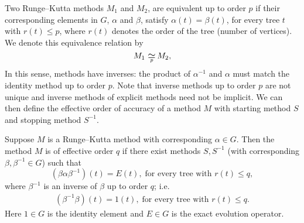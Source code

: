 Two Runge--Kutta methods $M_1$ and $M_2$, are equivalent up to order
$p$ if their corresponding elements in $G$, $\alpha$ and $\beta$, satisfy
$\alpha(t) = \beta(t)$, for every tree $t$ with $r(t) \leq p$,
where $r(t)$ denotes the order of the tree (number of vertices).
We denote this equivalence relation by
$$M_1 \equival{p} M_2,$$
In this sense, methods have inverses: the product of $\alpha^{-1}$ and
$\alpha$ must match the identity method up to order $p$.
Note that inverse methods up to order $p$ are not unique and inverse 
methods of explicit methods need not be implicit.
We can then define the effective order of accuracy of a method $M$
with starting method $S$ and stopping method $S^{-1}$. %
\begin{definition}\cite[\S~389]{Butcher2008_book}\label{def:Effective_order}
  Suppose $M$ is a Runge--Kutta method with corresponding $\alpha \in G$.
  Then the method $M$ is of effective order $q$ if there exist methods
  $S,S^{-1}$ (with corresponding $\beta, \beta^{-1} \in G$) such that
	\begin{equation}\label{eq:Effective_order_1}
		(\beta\alpha\beta^{-1})(t) = E(t), \; \text{for every tree with } r(t) \leq q,
	\end{equation}
        where $\beta^{-1}$ is an inverse of $\beta$ up to order $q$; i.e.
        \begin{align*}
        		(\beta^{-1}\beta)(t) = 1(t), \; \text{for every tree with } r(t) \leq q.
		\end{align*}	        
        Here $1\in G$ is the identity element
        and $E\in G$ is the exact evolution operator.
\end{definition}

